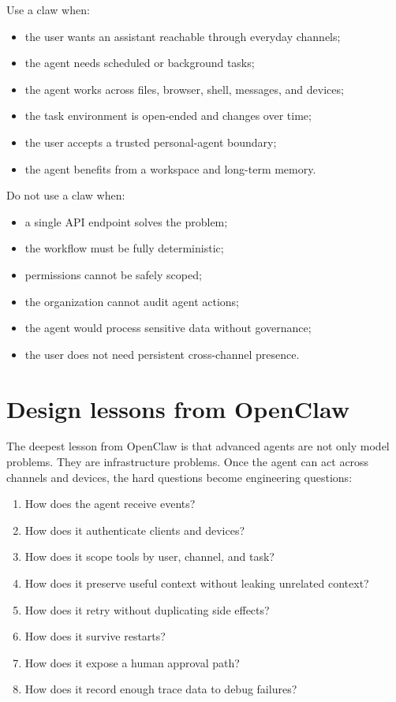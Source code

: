 Use a claw when:

\begin{itemize}[leftmargin=*]
  \item the user wants an assistant reachable through everyday channels;
  \item the agent needs scheduled or background tasks;
  \item the agent works across files, browser, shell, messages, and devices;
  \item the task environment is open-ended and changes over time;
  \item the user accepts a trusted personal-agent boundary;
  \item the agent benefits from a workspace and long-term memory.
\end{itemize}

Do not use a claw when:

\begin{itemize}[leftmargin=*]
  \item a single API endpoint solves the problem;
  \item the workflow must be fully deterministic;
  \item permissions cannot be safely scoped;
  \item the organization cannot audit agent actions;
  \item the agent would process sensitive data without governance;
  \item the user does not need persistent cross-channel presence.
\end{itemize}

\section{Design lessons from OpenClaw}

The deepest lesson from OpenClaw is that advanced agents are not only model problems. They are infrastructure problems. Once the agent can act across channels and devices, the hard questions become engineering questions:

\begin{enumerate}[leftmargin=*]
  \item How does the agent receive events?
  \item How does it authenticate clients and devices?
  \item How does it scope tools by user, channel, and task?
  \item How does it preserve useful context without leaking unrelated context?
  \item How does it retry without duplicating side effects?
  \item How does it survive restarts?
  \item How does it expose a human approval path?
  \item How does it record enough trace data to debug failures?
\end{enumerate}

